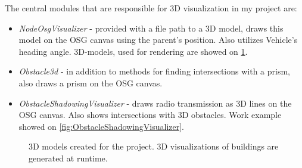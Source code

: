 \documentclass[]{nsm-thesis}
\begin{document}
The central modules that are responsible for 3D visualization in my project are: 

\begin{itemize}

\item \emph{NodeOsgVisualizer} - provided with a file path to a 3D model, draws this model on the \ac{OSG} canvas using the parent's position. Also utilizes Vehicle's heading angle. 3D-models, used for rendering are showed on \cref{fig:3dmodels}.

\item \emph{Obstacle3d} - in addition to methods for finding intersections with a prism, also draws a prism on the \ac{OSG} canvas.

\item \emph{ObstacleShadowingVisualizer} - draws radio transmission as 3D lines on the \ac{OSG} canvas. Also shows intersections with 3D obstacles. Work example showed on \cref{fig:ObstacleShadowingVisualizer}.

\end{itemize}

\begin{figure}%
    \centering
    \caption{3D models created for the project. 3D visualizations of buildings are generated at runtime.}%
    \label{fig:3dmodels}%
\end{figure}
\end{document}
